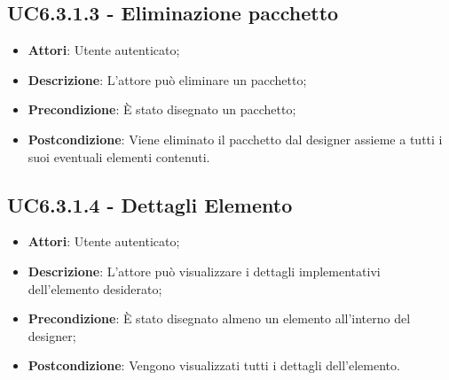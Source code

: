 \subsection{UC6.3.1.3 - Eliminazione pacchetto} 
\label{ssec:UC6.3.1.3} 
\begin{itemize} 
\item \textbf{Attori}: Utente autenticato;
\item \textbf{Descrizione}: L'attore può eliminare un pacchetto;
\item \textbf{Precondizione}: È stato disegnato un pacchetto;
\item \textbf{Postcondizione}: Viene eliminato il pacchetto dal designer assieme a tutti i suoi eventuali elementi contenuti.
\end{itemize} 
\subsection{UC6.3.1.4 - Dettagli Elemento} 
\label{ssec:UC6.3.1.4} 
\begin{itemize} 
\item \textbf{Attori}: Utente autenticato;
\item \textbf{Descrizione}: L'attore può visualizzare i dettagli implementativi dell'elemento desiderato;
\item \textbf{Precondizione}: È stato disegnato almeno un elemento all'interno del designer;
\item \textbf{Postcondizione}: Vengono visualizzati tutti i dettagli dell'elemento.
\end{itemize} 
\newpage
